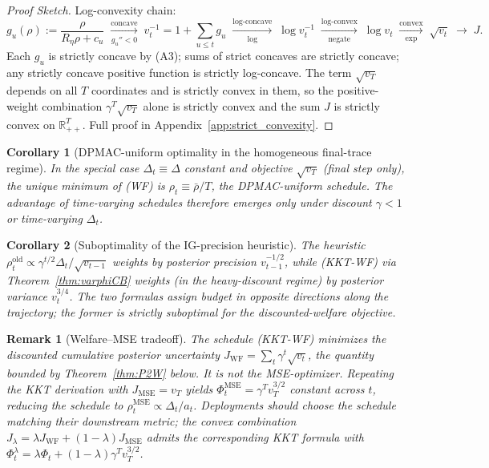 \documentclass{article}
\newtheorem{corollary}{Corollary}
\newtheorem{remark}{Remark}
\begin{document}
\begin{proof}
    [Proof Sketch]
    Log-convexity chain:
    $$g_u(\rho) := \frac{\rho}{R_\eta\rho + c_u} \;\xrightarrow[g_u''<0]{\text{concave}}\; v_t^{-1} = 1 + \sum_{u\le t}g_u \;\xrightarrow[\text{log}]{\text{log-concave}}\; \log v_t^{-1} \;\xrightarrow[\text{negate}]{\text{log-convex}}\; \log v_t \;\xrightarrow[\exp]{\text{convex}}\; \sqrt{v_t} \;\longrightarrow\; J.$$
    Each $g_u$ is strictly concave by (A3); sums of strict concaves are strictly concave; any strictly concave positive function is strictly log-concave. The term $\sqrt{v_T}$ depends on all $T$ coordinates and is strictly convex in them, so the positive-weight combination $\gamma^T \sqrt{v_T}$ alone is strictly convex and the sum $J$ is strictly convex on $\mathbb{R}_{++}^T$. Full proof in Appendix~\ref{app:strict_convexity}.
\end{proof}


\begin{corollary}[DPMAC-uniform optimality in the homogeneous final-trace regime]
    \label{cor:DPMAC}
    In the special case $\Delta_t \equiv \Delta$ constant and objective $\sqrt{v_T}$ (final step only), the unique minimum of (WF) is $\rho_t \equiv \bar\rho/T$, the DPMAC-uniform schedule. The advantage of time-varying schedules therefore emerges only under discount $\gamma < 1$ or time-varying $\Delta_t$.
\end{corollary}

\begin{corollary}[Suboptimality of the IG-precision heuristic]
    The heuristic $\rho_t^{\mathrm{old}} \propto \gamma^{t/2} \Delta_t / \sqrt{v_{t-1}}$ weights by posterior precision $v_{t-1}^{-1/2}$, while (KKT-WF) via Theorem~\ref{thm:varphiCB} weights (in the heavy-discount regime) by posterior variance $v_t^{3/4}$. The two formulas assign budget in opposite directions along the trajectory; the former is strictly suboptimal for the discounted-welfare objective.
\end{corollary}

\begin{remark}
    [Welfare–MSE tradeoff]
    The schedule (KKT-WF) minimizes the discounted cumulative posterior uncertainty $J_{\mathrm{WF}} = \sum_t \gamma^t \sqrt{v_t}$, the quantity bounded by Theorem~\ref{thm:P2W} below. It is not the MSE-optimizer. Repeating the KKT derivation with $J_{\mathrm{MSE}} = v_T$ yields $\Phi_t^{\mathrm{MSE}} = \gamma^T v_T^{3/2}$ constant across $t$, reducing the schedule to $\rho_t^{\mathrm{MSE}} \propto \Delta_t/a_t$. Deployments should choose the schedule matching their downstream metric; the convex combination $J_\lambda = \lambda J_{\mathrm{WF}} + (1-\lambda)J_{\mathrm{MSE}}$ admits the corresponding KKT formula with $\Phi_t^\lambda = \lambda\Phi_t + (1-\lambda)\gamma^T v_T^{3/2}$.
\end{remark}
\end{document}
